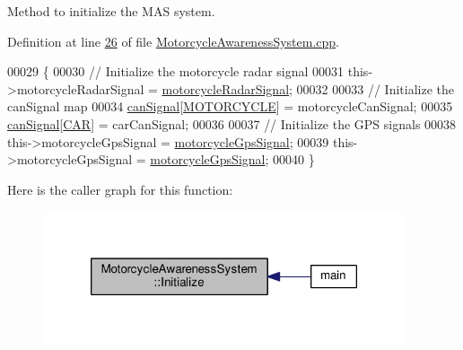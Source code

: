 Method to initialize the M\-A\-S system. 



Definition at line \hyperlink{MotorcycleAwarenessSystem_8cpp_source_l00026}{26} of file \hyperlink{MotorcycleAwarenessSystem_8cpp_source}{Motorcycle\-Awareness\-System.\-cpp}.


\begin{DoxyCode}
00029 \{
00030     \textcolor{comment}{// Initialize the motorcycle radar signal}
00031     this->motorcycleRadarSignal = \hyperlink{classMotorcycleAwarenessSystem_a0744e71b9f440a86f5078c876ba7629b}{motorcycleRadarSignal};
00032 
00033     \textcolor{comment}{// Initialize the canSignal map}
00034     \hyperlink{classMotorcycleAwarenessSystem_a2d8ac602ae24dcf38aaa95a42ffb4e1f}{canSignal}[\hyperlink{MotorcycleAwarenessSystemTypes_8hpp_a0c05c42b98a847f971385c81c2a81afaa39b983b1f7acfc4e7c900d77b0fded6a}{MOTORCYCLE}] = motorcycleCanSignal;
00035     \hyperlink{classMotorcycleAwarenessSystem_a2d8ac602ae24dcf38aaa95a42ffb4e1f}{canSignal}[\hyperlink{MotorcycleAwarenessSystemTypes_8hpp_a0c05c42b98a847f971385c81c2a81afaa5fc54ebcb1dd4bf1e1b93cbc77b57b40}{CAR}] = carCanSignal;
00036 
00037     \textcolor{comment}{// Initialize the GPS signals}
00038     this->motorcycleGpsSignal = \hyperlink{classMotorcycleAwarenessSystem_ab281a3993b574923b2f379ed0477b2d4}{motorcycleGpsSignal};
00039     this->motorcycleGpsSignal = \hyperlink{classMotorcycleAwarenessSystem_ab281a3993b574923b2f379ed0477b2d4}{motorcycleGpsSignal};
00040 \}
\end{DoxyCode}


Here is the caller graph for this function\-:\nopagebreak
\begin{figure}[H]
\begin{center}
\leavevmode
\includegraphics[width=302pt]{classMotorcycleAwarenessSystem_a55f1ea16b6311120ea42b460fb8b3a71_icgraph}
\end{center}
\end{figure}


